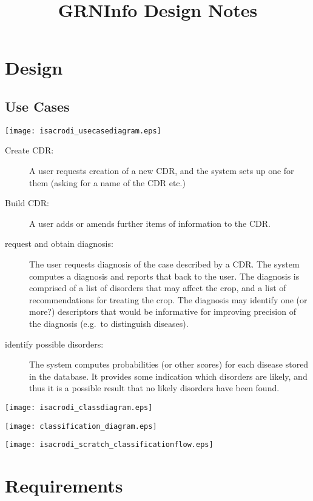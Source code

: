 \documentclass[a4paper,fleqn]{article}
\begin{document}
\title{GRNInfo Design Notes}
\author{}
\maketitle

\section{Design}

\subsection{Use Cases}

\texttt{[image: isacrodi\_usecasediagram.eps]}

\begin{description}
\item[Create CDR:] A user requests creation of a new CDR, and the
  system sets up one for them (asking for a name of the CDR etc.)
\item[Build CDR:] A user adds or amends further items of information
  to the CDR.
\item[request and obtain diagnosis:] The user requests diagnosis of
  the case described by a CDR. The system computes a diagnosis and
  reports that back to the user. The diagnosis is comprised of a list
  of disorders that may affect the crop, and a list of recommendations
  for treating the crop. The diagnosis may identify one (or more?)
  descriptors that would be informative for improving precision of the
  diagnosis (e.g.\ to distinguish diseases).
\item[identify possible disorders:] The system computes probabilities
  (or other scores) for each disease stored in the database. It
  provides some indication which disorders are likely, and thus it is
  a possible result that no likely disorders have been found.
\end{description}


\texttt{[image: isacrodi\_classdiagram.eps]}

\pagebreak

\appendix




\texttt{[image: classification\_diagram.eps]}

\texttt{[image: isacrodi\_scratch\_classificationflow.eps]}




\section{Requirements}
\end{document}
